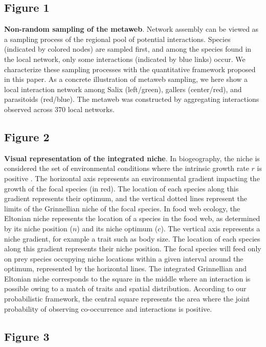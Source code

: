 \documentclass[12pt]{article}
\begin{document}
\subsection*{Figure 1}

\textbf{Non-random sampling of the metaweb}. Network assembly can be viewed
as a sampling process of the regional pool of potential interactions. Species
(indicated by colored nodes) are sampled first, and among the species found in
the local network, only some interactions (indicated by blue links) occur.
We characterize these sampling processes with the quantitative framework
proposed in this paper. As a concrete illustration of metaweb sampling, we
here show a local interaction network among Salix (left/green), gallers
(center/red), and parasitoids (red/blue). The metaweb was constructed by
aggregating interactions observed across 370 local networks.

\subsection*{Figure 2}

\textbf{Visual representation of the integrated niche}. In biogeography, the
niche is considered the set of environmental conditions where the intrinsic
growth rate $r$ is positive \citep{Holt2009a}. The horizontal axis represents
an environmental gradient impacting the growth of the focal species (in red).
The location of each species along this gradient represents their optimum, and
the vertical dotted lines represent the limits of the Grinnellian niche of the
focal species. In food web ecology, the Eltonian niche represents the location
of a species in the food web, as determined by its niche position ($n$) and
its niche optimum ($c$). The vertical axis represents a niche gradient,
for example a trait such as body size. The location of each species along this
gradient represents their niche position. The focal species will feed only on prey
species occupying niche locations within a given interval around the optimum,
represented by the horizontal lines. The integrated Grinnellian and Eltonian
niche corresponds to the square in the middle where an interaction is possible
owing to a match of traits and spatial distribution. According to our
probabilistic framework, the central square represents the area where the
joint probability of observing co-occurrence and interactions is positive.

\subsection*{Figure 3}
\end{document}
